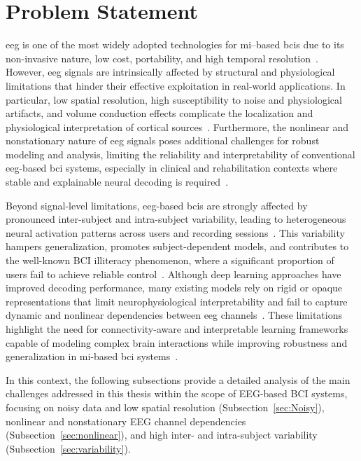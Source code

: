 \section{Problem Statement}\label{sec:problem_statement} 

\gls{eeg} is one of the most widely adopted technologies for \gls{mi}--based \glspl{bci} due to its non-invasive nature, low cost, portability, and high temporal resolution~\cite{singh2021comprehensive}. However, \gls{eeg} signals are intrinsically affected by structural and physiological limitations that hinder their effective exploitation in real-world applications. In particular, low spatial resolution, high susceptibility to noise and physiological artifacts, and volume conduction effects complicate the localization and physiological interpretation of cortical sources~\cite{wang2019eeg}. Furthermore, the nonlinear and nonstationary nature of \gls{eeg} signals poses additional challenges for robust modeling and analysis, limiting the reliability and interpretability of conventional \gls{eeg}-based \gls{bci} systems, especially in clinical and rehabilitation contexts where stable and explainable neural decoding is required~\cite{bouazizi2024interpretability}.

Beyond signal-level limitations, \gls{eeg}-based \glspl{bci} are strongly affected by pronounced inter-subject and intra-subject variability, leading to heterogeneous neural activation patterns across users and recording sessions~\cite{kim2023bridging,maswanganyi2022statistical}. This variability hampers generalization, promotes subject-dependent models, and contributes to the well-known BCI illiteracy phenomenon, where a significant proportion of users fail to achieve reliable control~\cite{saha2020intra,horowitz2021external}. Although deep learning approaches have improved decoding performance, many existing models rely on rigid or opaque representations that limit neurophysiological interpretability and fail to capture dynamic and nonlinear dependencies between \gls{eeg} channels~\cite{shoka2019literature,zhang2015bayesian}. These limitations highlight the need for connectivity-aware and interpretable learning frameworks capable of modeling complex brain interactions while improving robustness and generalization in \gls{mi}-based \gls{bci} systems~\cite{rolls2022effective}.

In this context, the following subsections provide a detailed analysis of the main challenges addressed in this thesis within the scope of EEG-based BCI systems, focusing on noisy data and low spatial resolution (Subsection~\ref{sec:Noisy}), nonlinear and nonstationary EEG channel dependencies (Subsection~\ref{sec:nonlinear}), and high inter- and intra-subject variability (Subsection~\ref{sec:variability}).

